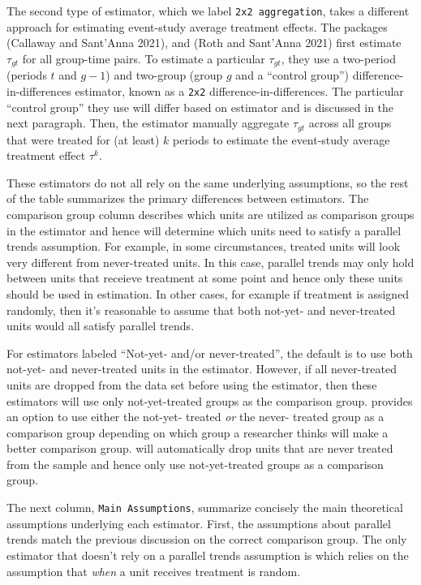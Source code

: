 The second type of estimator, which we label \texttt{2x2\ aggregation}, takes a different approach for estimating event-study average treatment effects. The packages  (Callaway and Sant'Anna 2021),  and  (Roth and Sant'Anna 2021) first estimate \(\tau_{gt}\) for all group-time pairs. To estimate a particular \(\tau_{gt}\), they use a two-period (periods \(t\) and \(g-1\)) and two-group (group \(g\) and a ``control group'') difference-in-differences estimator, known as a \texttt{2x2} difference-in-differences. The particular ``control group'' they use will differ based on estimator and is discussed in the next paragraph. Then, the estimator manually aggregate \(\tau_{gt}\) across all groups that were treated for (at least) \(k\) periods to estimate the event-study average treatment effect \(\tau^k\).

These estimators do not all rely on the same underlying assumptions, so the rest of the table summarizes the primary differences between estimators. The comparison group column describes which units are utilized as comparison groups in the estimator and hence will determine which units need to satisfy a parallel trends assumption. For example, in some circumstances, treated units will look very different from never-treated units. In this case, parallel trends may only hold between units that receieve treatment at some point and hence only these units should be used in estimation. In other cases, for example if treatment is assigned randomly, then it's reasonable to assume that both not-yet- and never-treated units would all satisfy parallel trends.

For estimators labeled ``Not-yet- and/or never-treated'', the default is to use both not-yet- and never-treated units in the estimator. However, if all never-treated units are dropped from the data set before using the estimator, then these estimators will use only not-yet-treated groups as the comparison group.  provides an option to use either the not-yet- treated \emph{or} the never- treated group as a comparison group depending on which group a researcher thinks will make a better comparison group.  will automatically drop units that are never treated from the sample and hence only use not-yet-treated groups as a comparison group.

The next column, \texttt{Main\ Assumptions}, summarize concisely the main theoretical assumptions underlying each estimator. First, the assumptions about parallel trends match the previous discussion on the correct comparison group. The only estimator that doesn't rely on a parallel trends assumption is  which relies on the assumption that \emph{when} a unit receives treatment is random.

